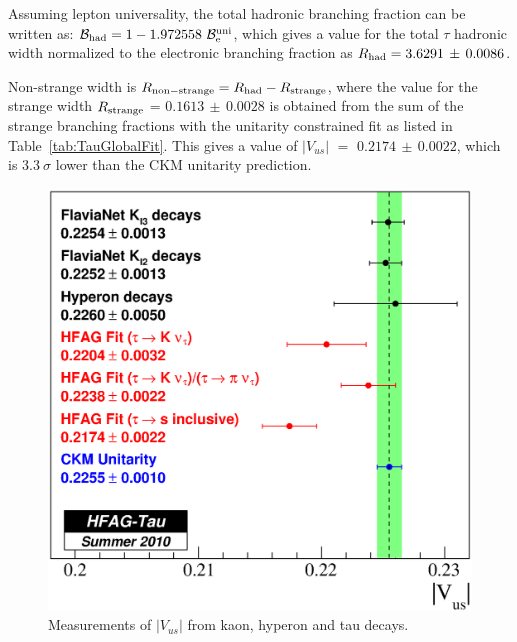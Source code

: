 \documentclass[fleqn,twoside]{article}
\def\Vus  {\ensuremath{|V_{us}|}\xspace}
\def\mtau       {\ensuremath{\tau}\xspace}
\begin{document}
Assuming lepton universality, the total hadronic branching fraction 
can be written as: ${\cal{B}}_{\rm{had}} = 1 - 1.972558 ~ {\cal{B}}^{\rm{uni}}_{\rm{e}}$,
which gives a value for the total \mtau hadronic width normalized to 
the electronic branching fraction as $R_{\rm{had}} = 3.6291\, \pm\, 0.0086$.

Non-strange width is $R_{\rm{non-strange}} = R_{\rm{had}} - R_{\rm{strange}}$,
where the value for the strange width $R_{\rm{strange}}$ = $0.1613\, \pm\, 0.0028$
is obtained from the sum of the strange branching fractions 
with the unitarity constrained fit as listed in Table~\ref{tab:TauGlobalFit}.
This gives a value of  $\Vus$ $=$ $0.2174\, \pm\, 0.0022$,
which is $3.3~\sigma$ lower than the CKM unitarity prediction.



\begin{figure}[!hbtp]
\begin{center}
\includegraphics[height=.38\textheight,width=.49\textwidth]{figures/Vus.eps}
\end{center}
\caption{Measurements of $\Vus$ from kaon, hyperon and tau decays.}
\label{fig:Vus}
\end{figure}
 
\end{document}
